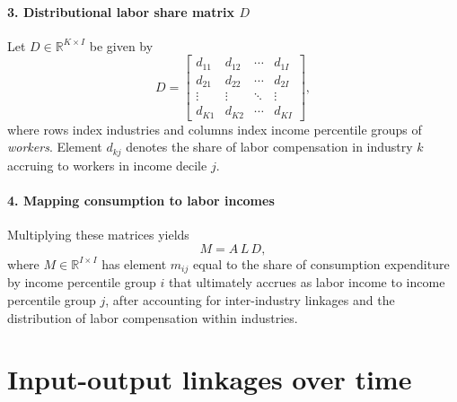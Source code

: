 \documentclass[12pt]{article}
\begin{document}
\paragraph{3. Distributional labor share matrix $D$}  
Let $D \in \mathbb{R}^{K \times I}$ be given by
\[
D =
\begin{bmatrix}
d_{11} & d_{12} & \cdots & d_{1I} \\
d_{21} & d_{22} & \cdots & d_{2I} \\
\vdots & \vdots & \ddots & \vdots \\
d_{K1} & d_{K2} & \cdots & d_{KI}
\end{bmatrix},
\]
where rows index industries and columns index income percentile groups of \emph{workers}.  
Element $d_{kj}$ denotes the share of labor compensation in industry $k$ accruing to workers in income decile $j$.

\paragraph{4. Mapping consumption to labor incomes}  
Multiplying these matrices yields
\[
M = A \, L \, D,
\]
where $M \in \mathbb{R}^{I \times I}$ has element $m_{ij}$ equal to the share of consumption expenditure by income percentile group $i$ that ultimately accrues as labor income to income percentile group $j$, after accounting for inter-industry linkages and the distribution of labor compensation within industries.

\section*{Input-output linkages over time}
\end{document}
